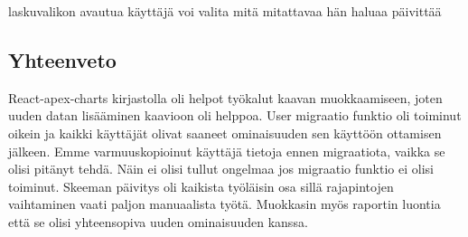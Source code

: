 laskuvalikon avautua käyttäjä voi valita mitä mitattavaa hän haluaa päivittää
\medskip

\fi




\subsection*{Yhteenveto}

React-apex-charts kirjastolla oli helpot työkalut kaavan muokkaamiseen, joten uuden datan lisääminen kaavioon oli helppoa.
User migraatio funktio oli toiminut oikein ja kaikki käyttäjät olivat saaneet ominaisuuden sen käyttöön ottamisen jälkeen.
Emme varmuuskopioinut käyttäjä tietoja ennen migraatiota, vaikka se olisi pitänyt tehdä. Näin ei olisi tullut ongelmaa jos migraatio funktio ei olisi toiminut.
Skeeman päivitys oli kaikista työläisin osa sillä rajapintojen vaihtaminen vaati paljon manuaalista työtä.
Muokkasin myös raportin luontia että se olisi yhteensopiva uuden ominaisuuden kanssa.




